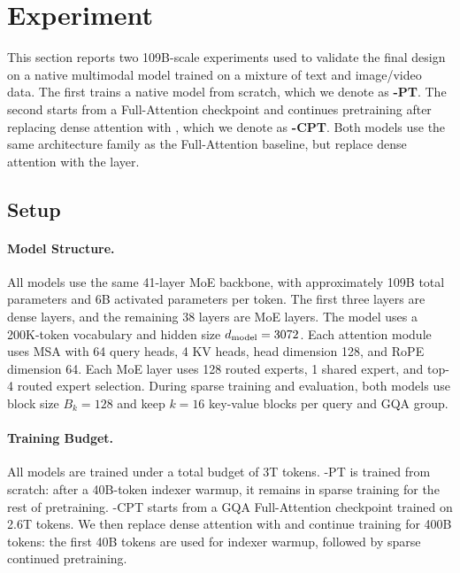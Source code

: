 \section{Experiment}
\label{sec:experiment}

This section reports two 109B-scale experiments used to validate the final \method{} design on a native multimodal model trained on a mixture of text and image/video data. The first trains a native \method{} model from scratch, which we denote as \textbf{\method{}-PT}. The second starts from a Full-Attention checkpoint and continues pretraining after replacing dense attention with \method{}, which we denote as \textbf{\method{}-CPT}. Both models use the same architecture family as the Full-Attention baseline, but replace dense attention with the \method{} layer.


\subsection{Setup}
\label{sec:experiment-setup}

\paragraph{Model Structure.} All models use the same 41-layer MoE backbone, with approximately 109B total parameters and 6B activated parameters per token. The first three layers are dense layers, and the remaining 38 layers are MoE layers. The model uses a 200K-token vocabulary and hidden size $d_{\rm model}=3072$. Each attention module uses MSA with 64 query heads, 4 KV heads, head dimension 128, and RoPE dimension 64. Each MoE layer uses 128 routed experts, 1 shared expert, and top-4 routed expert selection. During sparse training and evaluation, both \method{} models use block size \(B_k=128\) and keep \(k=16\) key-value blocks per query and GQA group.

\paragraph{Training Budget.} All models are trained under a total budget of 3T tokens. \method{}-PT is trained from scratch: after a 40B-token indexer warmup, it remains in sparse training for the rest of pretraining. \method{}-CPT starts from a GQA Full-Attention checkpoint trained on 2.6T tokens. We then replace dense attention with \method{} and continue training for 400B tokens: the first 40B tokens are used for indexer warmup, followed by sparse continued pretraining.

